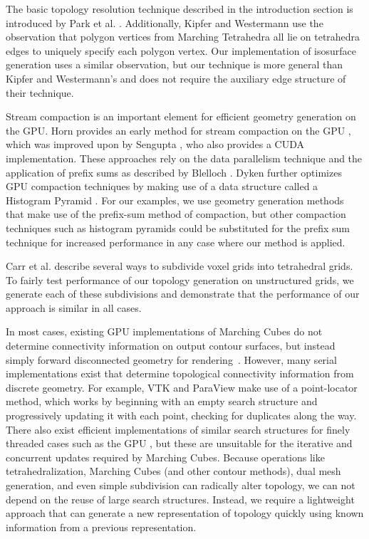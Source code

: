 \documentclass[10pt,journal,cspaper,compsoc]{IEEEtran}
\begin{document}
The basic topology resolution technique described in the introduction
section is introduced by Park et al. \cite{Park}.  Additionally, Kipfer and
Westermann \cite{Kipfer2005} use the observation that polygon vertices from
Marching Tetrahedra all lie on tetrahedra edges to uniquely specify each
polygon vertex. Our implementation of isosurface generation uses a similar
observation, but our technique is more general than Kipfer and Westermann's
and does not require the auxiliary edge structure of their technique.

Stream compaction is an important element for efficient geometry generation on the GPU.
Horn provides an early method for stream compaction on the GPU \cite{Horn2005}, which
was improved upon by Sengupta \cite{Sengupta2007}, who also provides a CUDA implementation. 
These approaches rely on the data parallelism technique and the application of prefix sums 
as described by Blelloch \cite{Blelloch1990}. Dyken further optimizes
GPU compaction techniques by making use of a data structure called a Histogram Pyramid \cite{Dyken2008}.
For our examples, we use geometry generation methods that make use of the prefix-sum
method of compaction, but other compaction techniques such as histogram pyramids could be
substituted for the prefix sum technique for increased performance in any case where our method is applied.

Carr et al. \cite{Carr2006} describe several ways to subdivide voxel grids into tetrahedral grids. To fairly test performance of our topology generation on unstructured grids, we generate each of these subdivisions and demonstrate that the performance of our approach is similar in all cases.

In most cases, existing GPU implementations of Marching Cubes do not determine connectivity information on output contour surfaces, but instead simply forward disconnected geometry for rendering~\cite{Dyken2008,Goetz_Junklewitz_Domik_2005,Johansson_Carr_2006}. However, many serial implementations exist that determine topological connectivity information from discrete geometry. For example, VTK and ParaView make use of a point-locator method, which works by beginning with an empty search structure and progressively updating it with each point, checking for duplicates along the way. There also exist efficient implementations of similar search structures for finely threaded cases such as the GPU \cite{Zhou_Hou_Wang_Guo_2008}, but these are unsuitable for the iterative and concurrent updates required by Marching Cubes. Because operations like tetrahedralization, Marching Cubes (and other contour methods), dual mesh generation, and even simple subdivision can radically alter topology, we can not depend on the reuse of large search structures. Instead, we require a lightweight approach that can generate a new representation of topology quickly using known information from a previous representation.
\end{document}
